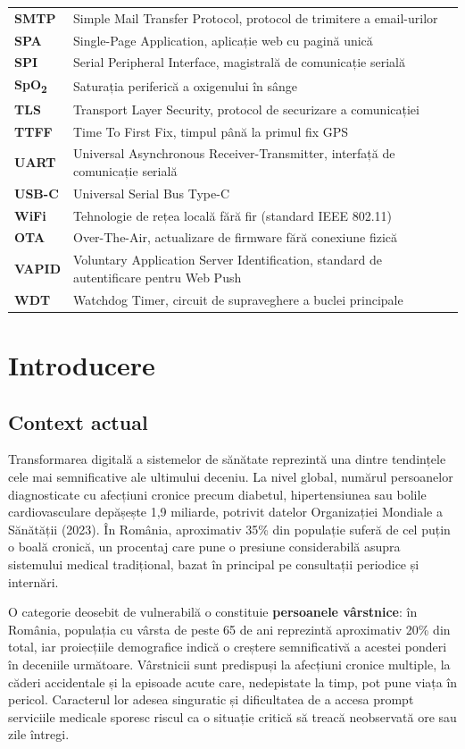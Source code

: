 \documentclass[12pt,a4paper,twoside]{article}
\newcommand{\spo}{SpO\textsubscript{2}}
\begin{document}
{\begin{longtable}{@{}>{\bfseries}p{2.7cm}p{10.6cm}@{}}
SMTP & Simple Mail Transfer Protocol, protocol de trimitere a email-urilor\\
SPA & Single-Page Application, aplicație web cu pagină unică\\
SPI & Serial Peripheral Interface, magistrală de comunicație serială\\
\spo & Saturația periferică a oxigenului în sânge\\
TLS & Transport Layer Security, protocol de securizare a comunicației\\
TTFF & Time To First Fix, timpul până la primul fix GPS\\
UART & Universal Asynchronous Receiver-Transmitter, interfață de comunicație serială\\
USB-C & Universal Serial Bus Type-C\\
WiFi & Tehnologie de rețea locală fără fir (standard IEEE 802.11)\\
OTA & Over-The-Air, actualizare de firmware fără conexiune fizică\\
VAPID & Voluntary Application Server Identification, standard de autentificare pentru Web Push\\
WDT & Watchdog Timer, circuit de supraveghere a buclei principale\\
\end{longtable}
}
\addtocounter{table}{-1}

\newpage

\section{Introducere}

\subsection{Context actual}

Transformarea digitală a sistemelor de sănătate reprezintă una dintre tendințele cele mai semnificative ale ultimului deceniu. La nivel global, numărul persoanelor diagnosticate cu afecțiuni cronice precum diabetul, hipertensiunea sau bolile cardiovasculare depășește 1,9 miliarde, potrivit datelor Organizației Mondiale a Sănătății (2023). În România, aproximativ 35\% din populație suferă de cel puțin o boală cronică, un procentaj care pune o presiune considerabilă asupra sistemului medical tradițional, bazat în principal pe consultații periodice și internări.

O categorie deosebit de vulnerabilă o constituie \textbf{persoanele vârstnice}: în România, populația cu vârsta de peste 65 de ani reprezintă aproximativ 20\% din total, iar proiecțiile demografice indică o creștere semnificativă a acestei ponderi în deceniile următoare. Vârstnicii sunt predispuși la afecțiuni cronice multiple, la căderi accidentale și la episoade acute care, nedepistate la timp, pot pune viața în pericol. Caracterul lor adesea singuratic și dificultatea de a accesa prompt serviciile medicale sporesc riscul ca o situație critică să treacă neobservată ore sau zile întregi.
\end{document}
